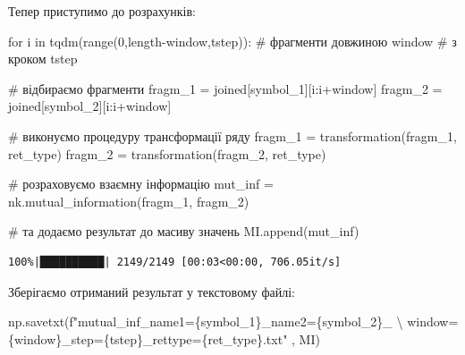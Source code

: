 \documentclass[
  letterpaper,
]{report}
\newenvironment{Shaded}{\begin{snugshade}}{\end{snugshade}}
\newcommand{\BuiltInTok}[1]{\textcolor[rgb]{0.00,0.23,0.31}{#1}}
\newcommand{\CharTok}[1]{\textcolor[rgb]{0.13,0.47,0.30}{#1}}
\newcommand{\CommentTok}[1]{\textcolor[rgb]{0.37,0.37,0.37}{#1}}
\newcommand{\ControlFlowTok}[1]{\textcolor[rgb]{0.00,0.23,0.31}{#1}}
\newcommand{\DecValTok}[1]{\textcolor[rgb]{0.68,0.00,0.00}{#1}}
\newcommand{\KeywordTok}[1]{\textcolor[rgb]{0.00,0.23,0.31}{#1}}
\newcommand{\NormalTok}[1]{\textcolor[rgb]{0.00,0.23,0.31}{#1}}
\newcommand{\OperatorTok}[1]{\textcolor[rgb]{0.37,0.37,0.37}{#1}}
\newcommand{\SpecialCharTok}[1]{\textcolor[rgb]{0.37,0.37,0.37}{#1}}
\newcommand{\SpecialStringTok}[1]{\textcolor[rgb]{0.13,0.47,0.30}{#1}}
\begin{document}
Тепер приступимо до розрахунків:

\begin{Shaded}
\begin{Highlighting}[]
\ControlFlowTok{for}\NormalTok{ i }\KeywordTok{in}\NormalTok{ tqdm(}\BuiltInTok{range}\NormalTok{(}\DecValTok{0}\NormalTok{,length}\OperatorTok{{-}}\NormalTok{window,tstep)):       }\CommentTok{\# фрагменти довжиною window  }
                                                   \CommentTok{\# з кроком tstep}

    \CommentTok{\# відбираємо фрагменти}
\NormalTok{    fragm\_1 }\OperatorTok{=}\NormalTok{ joined[symbol\_1][i:i}\OperatorTok{+}\NormalTok{window]  }
\NormalTok{    fragm\_2 }\OperatorTok{=}\NormalTok{ joined[symbol\_2][i:i}\OperatorTok{+}\NormalTok{window]}

    \CommentTok{\# виконуємо процедуру трансформації ряду }
\NormalTok{    fragm\_1 }\OperatorTok{=}\NormalTok{ transformation(fragm\_1, ret\_type)    }
\NormalTok{    fragm\_2 }\OperatorTok{=}\NormalTok{ transformation(fragm\_2, ret\_type)}

    \CommentTok{\# розраховуємо взаємну інформацію }
\NormalTok{    mut\_inf }\OperatorTok{=}\NormalTok{ nk.mutual\_information(fragm\_1, fragm\_2)}
    
    \CommentTok{\# та додаємо результат до масиву значень}
\NormalTok{    MI.append(mut\_inf)}
\end{Highlighting}
\end{Shaded}

\begin{verbatim}
100%|██████████| 2149/2149 [00:03<00:00, 706.05it/s]
\end{verbatim}

Зберігаємо отриманий результат у текстовому файлі:

\begin{Shaded}
\begin{Highlighting}[]
\NormalTok{np.savetxt(}\SpecialStringTok{f"mutual\_inf\_name1=}\SpecialCharTok{\{}\NormalTok{symbol\_1}\SpecialCharTok{\}}\SpecialStringTok{\_name2=}\SpecialCharTok{\{}\NormalTok{symbol\_2}\SpecialCharTok{\}}\SpecialStringTok{\_ }\CharTok{\textbackslash{}}
\SpecialStringTok{    window=}\SpecialCharTok{\{}\NormalTok{window}\SpecialCharTok{\}}\SpecialStringTok{\_step=}\SpecialCharTok{\{}\NormalTok{tstep}\SpecialCharTok{\}}\SpecialStringTok{\_rettype=}\SpecialCharTok{\{}\NormalTok{ret\_type}\SpecialCharTok{\}}\SpecialStringTok{.txt"}\NormalTok{ , MI)}
\end{Highlighting}
\end{Shaded}
\end{document}
